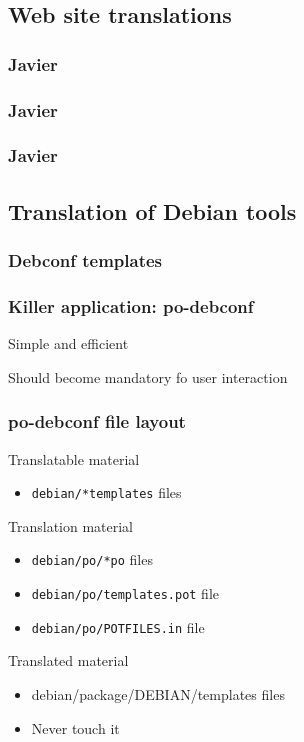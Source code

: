 \documentclass{beamer}
\begin{document}
\subsection{Web site translations}

\begin{frame}
  \frametitle{Javier}
\end{frame}

\begin{frame}
  \frametitle{Javier}
\end{frame}

\begin{frame}
  \frametitle{Javier}
\end{frame}

\subsection{Translation of Debian tools}

\subsubsection{Debconf templates}

\begin{frame}
  \frametitle{Killer application: po-debconf}
	\begin{block}
		{Simple and efficient}
	\end{block}
	\begin{block}
		{Should become mandatory fo user interaction}
	\end{block}
\end{frame}

\begin{frame}
  \frametitle{po-debconf file layout}
	\begin{block}{Translatable material}
		\begin{itemize}
		\item
			\texttt{debian/*templates} files
		\end{itemize}
	\end{block}
	\begin{block}{Translation material}
		\begin{itemize}
		\item
			\texttt{debian/po/*po} files
		\item
			\texttt{debian/po/templates.pot} file
		\item
			\texttt{debian/po/POTFILES.in} file
		\end{itemize}
	\end{block}
	\begin{block}{Translated material}
		\begin{itemize}
		\item
			debian/package/DEBIAN/templates files
		\item
			Never touch it
		\end{itemize}
	\end{block}
\end{frame}
\end{document}
